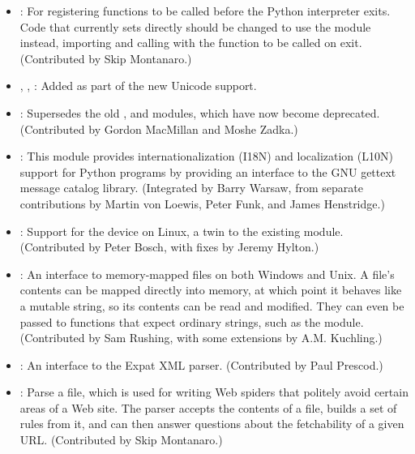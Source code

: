 \documentclass{howto}
\begin{document}
\begin{itemize}

\item{}: 
For registering functions to be called before the Python interpreter exits.
Code that currently sets
 directly should be changed to 
use the  module instead, importing 
and calling  with 
the function to be called on exit.
(Contributed by Skip Montanaro.)

\item{, , :}  Added as part of the new Unicode support. 

\item{:} Supersedes the old ,  and
 modules, which have now become deprecated.
(Contributed by Gordon MacMillan and Moshe Zadka.)

\item{:} This module provides internationalization
(I18N) and localization (L10N) support for Python programs by
providing an interface to the GNU gettext message catalog library.
(Integrated by Barry Warsaw, from separate contributions by Martin von
Loewis, Peter Funk, and James Henstridge.)

\item{:} Support for the 
device on Linux, a twin to the existing  module.
(Contributed by Peter Bosch, with fixes by Jeremy Hylton.)

\item{:} An interface to memory-mapped files on both
Windows and Unix.  A file's contents can be mapped directly into
memory, at which point it behaves like a mutable string, so its
contents can be read and modified.  They can even be passed to
functions that expect ordinary strings, such as the 
module. (Contributed by Sam Rushing, with some extensions by
A.M. Kuchling.)

\item{:} An interface to the Expat XML parser.
(Contributed by Paul Prescod.)

\item{:} Parse a  file, which is
used for writing Web spiders that politely avoid certain areas of a
Web site.  The parser accepts the contents of a  file,
builds a set of rules from it, and can then answer questions about
the fetchability of a given URL.  (Contributed by Skip Montanaro.)


\end{itemize}
\end{document}
